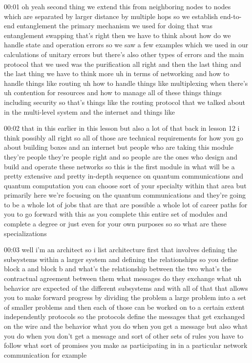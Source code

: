 00:01
oh yeah second thing we extend this from neighboring nodes to nodes which
are separated by larger distance by multiple hops so we
establish end-to-end entanglement the primary mechanism we used for doing that
was entanglement swapping that's right then we have to think about how do we
handle state and operation errors so we saw a few examples which we used
in our calculations of unitary errors but there's also other types of errors
and the main protocol that we used was the purification
all right and then the last thing and the last thing we have to think more
uh in terms of networking and how to handle things like
routing uh how to handle things like multiplexing
when there's uh contention for resources and how to manage all of these things
things including security so that's things like the routing protocol
that we talked about in the multi-level system and the internet and things like

00:02
that in this earlier in this lesson but also a lot of that back in lesson
12 i think possibly all right so all of those are technical
requirements for how you go about building boxes and an internet but
people who are taking this module they're people they're people
right and so people are the ones who design and build and operate these networks
so this is the first module in what will be a pretty
extensive and pretty in-depth sequence on quantum communications and quantum
computation you can choose sort of your specialty
within that area but primarily here we're focusing on the quantum communications
and they're going to be a whole lot of jobs that are that are possible a whole
lot of career paths for you to go forward with this
as you complete this entire set of modules and complete a degree
or just even for your own purposes so so what are these specializations

00:03
well i'm an architect so i list architecture first
that involves defining the subsystems within a larger system and defining the
relationships so you define block a and block b and what's the
relationship between the two what's the contractual agreement between
them what messages do they exchange what uh behavior are expected of the
different subsystems and with all of that that allows you to
make forward progress by dividing the problem a large problem into a set of
smaller problems and then each of those can be worked on
to a certain extent independently protocols so the protocols define
the messages that get exchanged on the wire and the behavior what you do when
you get a message but also what you do when you don't get a message and sort of
other sets of rules you have to follow what sort of promises you make as
participating in in a particular network communication for example

